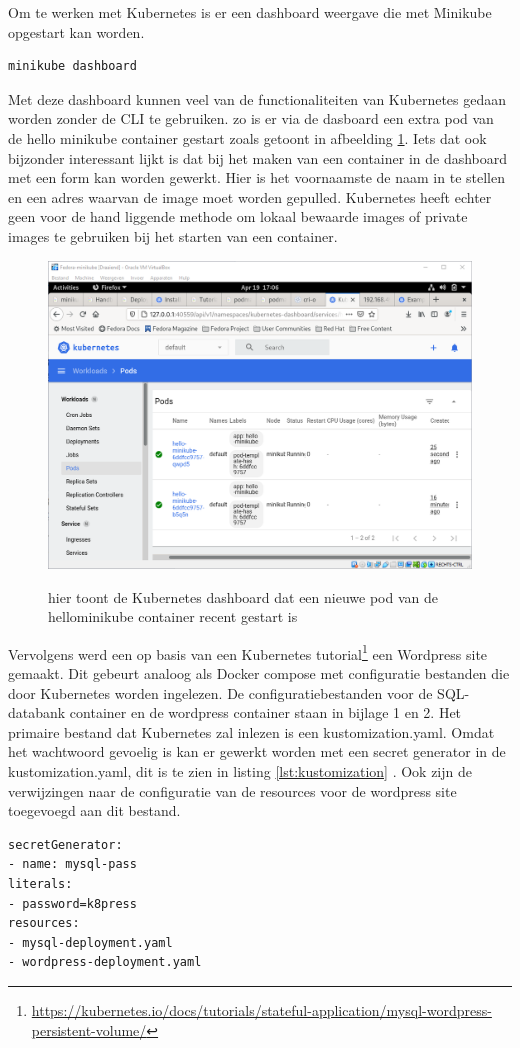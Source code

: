 Om te werken met Kubernetes is er een dashboard weergave die met Minikube opgestart kan worden.
\begin{verbatim}
minikube dashboard
\end{verbatim}
Met deze dashboard kunnen veel van de functionaliteiten van Kubernetes gedaan worden zonder de CLI te gebruiken. zo is er via de dasboard een extra pod van de hello minikube container gestart zoals getoont in afbeelding \ref{fig:kubenetesDash}. Iets dat ook bijzonder interessant lijkt is dat bij het maken van een container in de dashboard met een form kan worden gewerkt. Hier is het voornaamste de naam in te stellen en een adres waarvan de image moet worden gepulled. Kubernetes heeft echter geen voor de hand liggende methode om lokaal bewaarde images of private images te gebruiken bij het starten van een container.
\begin{figure}[h]
    \includegraphics[width=\linewidth]{img/kubenetesDash.png}
    \label{fig:kubenetesDash}
    \caption[the kubenetes Dashboard]{hier toont de Kubernetes dashboard dat een nieuwe pod van de hellominikube container recent gestart is}
    \centering
\end{figure}
Vervolgens werd een op basis van een Kubernetes tutorial\footnote{\url{https://kubernetes.io/docs/tutorials/stateful-application/mysql-wordpress-persistent-volume/}}  een Wordpress site gemaakt. Dit gebeurt analoog als Docker compose met configuratie bestanden die door Kubernetes worden ingelezen. De configuratiebestanden voor de SQL-databank container en de wordpress container staan in bijlage 1 en 2. Het primaire bestand dat Kubernetes zal inlezen is een kustomization.yaml. Omdat het wachtwoord gevoelig is kan er gewerkt worden met een secret generator in de kustomization.yaml, dit is te zien in listing \ref{lst:kustomization} . Ook zijn de verwijzingen naar de configuratie van de resources voor de wordpress site toegevoegd aan dit bestand.
\begin{lstlisting}[caption=inhoud van kustomization.yaml,label=lst:kustomization]
secretGenerator:
- name: mysql-pass
literals:
- password=k8press
resources:
- mysql-deployment.yaml
- wordpress-deployment.yaml
\end{lstlisting}

